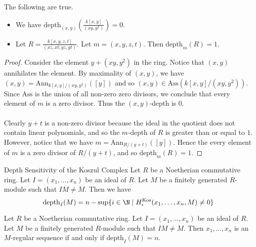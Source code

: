 \documentclass[a4paper]{article}
\begin{document}
\begin{eg}{} The following are true. 
\begin{itemize}
\item We have $\text{depth}_{(x,y)}\left(\frac{k[x,y]}{(xy,y^2)}\right)=0$. 
\item Let $R=\frac{k[x,y,z,t]}{(xz,xt,yz,yt)}$. Let $m=(x,y,z,t)$. Then $\text{depth}_m(R)=1$. 
\end{itemize} \tcbline
\begin{proof}
Consider the element $y+(xy,y^2)$ in the ring. Notice that $(x,y)$ annihilates the element. By maximality of $(x,y)$, we have $(x,y)=\text{Ann}_{k[x,y]/(xy,y^2)}([y])$ and so $(x,y)\in\text{Ass}(k[x,y]/(xy,y^2))$. Since $\text{Ass}$ is the union of all non-zero zero divisors, we conclude that every element of $m$ is a zero divisor. Thus the $(x,y)$-depth is $0$. \\~\\

Clearly $y+t$ is a non-zero divisor because the ideal in the quotient does not contain linear polynomials, and so the $m$-depth of $R$ is greater than or equal to $1$. However, notice that we have $m=\text{Ann}_{R/(y+t)}([y])$. Hence the every element of $m$ is a zero divisor of $R/(y+t)$, and so $\text{depth}_m(R)=1$. 
\end{proof}
\end{eg}

\begin{prp}{Depth Sensitivity of the Koszul Complex}{} Let $R$ be a Noetherian commutative ring. Let $I=(x_1,\dots,x_n)$ be an ideal of $R$. Let $M$ be a finitely generated $R$-module such that $IM\neq M$. Then we have $$\text{depth}_I(M)=n-\sup\{i\in\N\;|\;H_i^\text{Kos}(x_1,\dots,x_n,M)\neq 0\}$$
\end{prp}

\begin{crl}{}{} Let $R$ be a Noetherian commutative ring. Let $I=(x_1,\dots,x_n)$ be an ideal of $R$. Let $M$ be a finitely generated $R$-module such that $IM\neq M$. Then $x_1,\dots,x_n$ is an $M$-regular sequence if and only if $\text{depth}_I(M)=n$. 
\end{crl}
\end{document}
